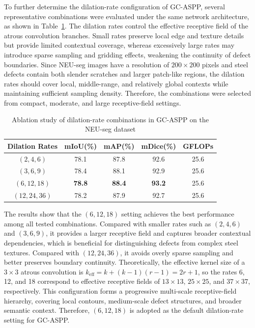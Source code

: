 \documentclass[sn-basic]{sn-jnl}
\theoremstyle{thmstyleone}%
\theoremstyle{thmstyletwo}%
\theoremstyle{thmstylethree}%
\begin{document}
To further determine the dilation-rate configuration of GC-ASPP, several representative combinations were evaluated under the same network architecture, as shown in Table~\ref{tab:gcaspp_dilation}. The dilation rates control the effective receptive field of the atrous convolution branches. Small rates preserve local edge and texture details but provide limited contextual coverage, whereas excessively large rates may introduce sparse sampling and gridding effects, weakening the continuity of defect boundaries. Since NEU-seg images have a resolution of $200\times200$ pixels and steel defects contain both slender scratches and larger patch-like regions, the dilation rates should cover local, middle-range, and relatively global contexts while maintaining sufficient sampling density. Therefore, the combinations were selected from compact, moderate, and large receptive-field settings.

\begin{table}[htbp]
\caption{Ablation study of dilation-rate combinations in GC-ASPP on the NEU-seg dataset}
\label{tab:gcaspp_dilation}
\centering
\begin{tabular}{ccccc}
\toprule
Dilation Rates & mIoU(\%) & mAP(\%) & mDice(\%) & GFLOPs \\
\midrule
$(2,4,6)$ & 78.1 & 87.8 & 92.6 & 25.6 \\
$(3,6,9)$ & 78.4 & 88.1 & 92.9 & 25.6 \\
$(6,12,18)$ & \textbf{78.8} & \textbf{88.4} & \textbf{93.2} & 25.6 \\
$(12,24,36)$ & 78.2 & 87.9 & 92.7 & 25.6 \\
\bottomrule
\end{tabular}
\end{table}

The results show that the $(6,12,18)$ setting achieves the best performance among all tested combinations. Compared with smaller rates such as $(2,4,6)$ and $(3,6,9)$, it provides a larger receptive field and captures broader contextual dependencies, which is beneficial for distinguishing defects from complex steel textures. Compared with $(12,24,36)$, it avoids overly sparse sampling and better preserves boundary continuity. Theoretically, the effective kernel size of a $3\times3$ atrous convolution is $k_{\mathrm{eff}}=k+(k-1)(r-1)=2r+1$, so the rates 6, 12, and 18 correspond to effective receptive fields of $13\times13$, $25\times25$, and $37\times37$, respectively. This configuration forms a progressive multi-scale receptive-field hierarchy, covering local contours, medium-scale defect structures, and broader semantic context. Therefore, $(6,12,18)$ is adopted as the default dilation-rate setting for GC-ASPP.
\end{document}
